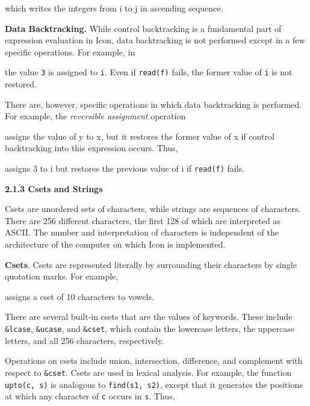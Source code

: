 \noindent
which writes the integers from i to j in ascending sequence.


\textbf{Data Backtracking.} While control backtracking is a
fundamental part of expression evaluation in Icon, data backtracking
is not performed except in a few specific operations. For example, in



\noindent the value \texttt{3} is assigned to \texttt{i}. Even if
\texttt{read(f)} fails, the former value of \texttt{i} is not
restored.

There are, however, specific operations in which data backtracking is
performed. For example, the \textit{reversible assignment} operation



\noindent assigns the value of y to x, but it restores the former
value of x if control backtracking into this expression occurs.  Thus,



\noindent
assigns 3 to i but restores the previous value of i if \texttt{read(f)} fails.

{\sffamily\bfseries
2.1.3 Csets and Strings}


Csets are unordered sets of characters, while strings are sequences of
characters. There are 256 different characters, the first 128 of which
are interpreted as ASCII. The number and interpretation of characters
is independent of the architecture of the computer on which Icon is
implemented.


\textbf{Csets}. Csets are represented literally by surrounding their
characters by single quotation marks. For example,



\noindent assigns a cset of 10 characters to vowels.

There are several built-in csets that are the values of
keywords. These include \texttt{\&lcase}, \texttt{\&ucase}, and
\texttt{\&cset}, which contain the lowercase letters, the uppercase
letters, and all 256 characters, respectively.

Operations on csets include union, intersection, difference, and
complement with respect to \texttt{\&cset}. Csets are used in lexical
analysis. For example, the function \texttt{upto(c, s)} is analogous
to \texttt{find(s1, s2)}, except that it generates the positions at
which any character of \texttt{c} occurs in \texttt{s}. Thus,

